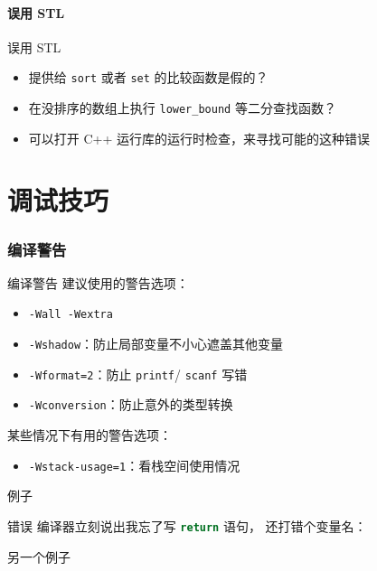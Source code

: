 \documentclass[10pt,mathserif]{beamer}%
\begin{document}
\subsection{误用 STL}
\begin{frame}{误用 STL}
	\begin{itemize}
		\item 提供给 \lstinline|sort| 或者 \lstinline|set|
			的比较函数是假的？
		\item 在没排序的数组上执行 \lstinline|lower_bound| 等二分查找函数？
		\item 可以打开 C++ 运行库的运行时检查，来寻找可能的这种错误
	\end{itemize}
\end{frame}

\part{调试技巧}

\section{编译警告}
\begin{frame}{编译警告}
	建议使用的警告选项：
	\begin{itemize}
		\item \lstinline|-Wall -Wextra|
		\item \lstinline|-Wshadow|：防止局部变量不小心遮盖其他变量
		\item \lstinline|-Wformat=2|：防止 \lstinline|printf|/
			\lstinline|scanf| 写错
		\item \lstinline|-Wconversion|：防止意外的类型转换
	\end{itemize}
	某些情况下有用的警告选项：
	\begin{itemize}
		\item \lstinline|-Wstack-usage=1|：看栈空间使用情况
	\end{itemize}
\end{frame}

\begin{frame}{例子}
	
\end{frame}

\begin{frame}{错误}
	编译器立刻说出我忘了写 \lstinline[language=C++]!return! 语句，
	还打错个变量名：
	
\end{frame}

\begin{frame}{另一个例子}
	
\end{frame}
\end{document}
